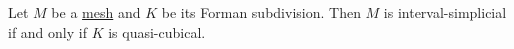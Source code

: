 \begin{proposition}
  Let
    $M$ be a \hyperref[cmc:mesh:definition]{mesh}
    and $K$ be its Forman subdivision.
  Then $M$ is interval-simplicial if and only if $K$ is quasi-cubical.
\end{proposition}
